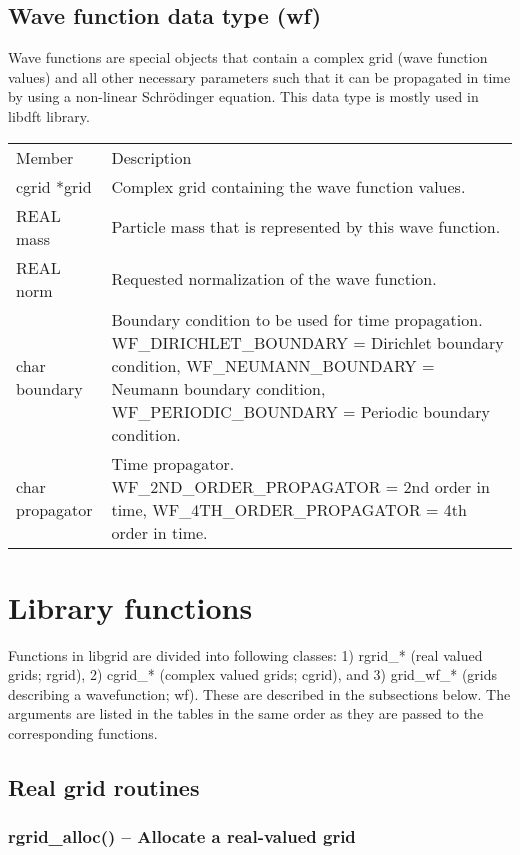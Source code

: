 \documentclass[12pt,letterpaper]{article}
\begin{document}
\subsection{Wave function data type (wf)}

Wave functions are special objects that contain a complex grid (wave function values) and all other necessary parameters such that it can be propagated in time by using a non-linear Schr\"odinger equation. This data type is mostly used in libdft library.

\begin{longtable}{p{} p{}}
Member & Description\\
\cline{1-2}
cgrid *grid & Complex grid containing the wave function values.\\
REAL mass & Particle mass that is represented by this wave function.\\
REAL norm & Requested normalization of the wave function.\\
char boundary & Boundary condition to be used for time propagation. WF\_DIRICHLET\_BOUNDARY = Dirichlet boundary condition, WF\_NEUMANN\_BOUNDARY = Neumann boundary condition, WF\_PERIODIC\_BOUNDARY = Periodic boundary condition.\\
char propagator & Time propagator. WF\_2ND\_ORDER\_PROPAGATOR = 2nd order in time, WF\_4TH\_ORDER\_PROPAGATOR = 4th order in time.\\
\end{longtable}

\section{Library functions}

Functions in libgrid are divided into following classes: 1) rgrid\_* (real valued grids; rgrid), 2) cgrid\_* (complex valued grids; cgrid), and 3) grid\_wf\_* (grids describing a wavefunction; wf). These are described in the subsections below. The arguments are listed in the tables in the same order as they are passed to the corresponding functions.

\subsection{Real grid routines}

\subsubsection{rgrid\_alloc() -- Allocate a real-valued grid}
\end{document}

